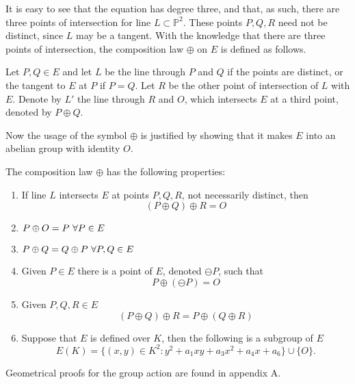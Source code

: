 It is easy to see that the equation has degree three, and that, as such, there are three points of intersection for line $L\subset\mathbb{P}^2$. These points $P,Q,R$ need not be distinct, since $L$ may be a tangent. 
With the knowledge that there are three points of intersection, the composition law $\oplus$ on $E$ is defined as follows.
\begin{defn}
	Let $P,Q\in E$ and let $L$ be the line through $P$ and $Q$ if the points are distinct, or the tangent to $E$ at $P$ if $P=Q$. Let $R$ be the other point of intersection of $L$ with $E$. Denote by $L'$ the line through $R$ and $O$, which intersects $E$ at a third point, denoted by $P\oplus Q$.
\end{defn}
Now the usage of the symbol $\oplus$ is justified by showing that it makes $E$ into an abelian group with identity $O$.
\begin{thm}
	The composition law $\oplus$ has the following properties:
	\begin{enumerate}
		\item If line $L$ intersects $E$ at points $P,Q,R$, not necessarily distinct, then
		\begin{equation*}
		(P\oplus Q)\oplus R=O
		\end{equation*}
		\item $P\oplus O=P\text{\space}\forall P\in E$
		\item $P\oplus Q=Q\oplus P\text{\space}\forall P,Q\in E$
		\item Given $P\in E$ there is a point of $E$, denoted $\ominus P$, such that
		\begin{equation*}
		P\oplus(\ominus P)=O
		\end{equation*}
		\item Given $P,Q,R\in E$
		\begin{equation*}
		(P\oplus Q)\oplus R=P\oplus(Q\oplus R)
		\end{equation*}
		\item Suppose that $E$ is defined over $K$, then the following is a subgroup of $E$
		\begin{equation*}
		E(K)=\{(x,y)\in K^2:y^2+a_1xy+a_3x^2+a_4x+a_6\}\cup\{O\}.
		\end{equation*}
	\end{enumerate}
\end{thm}
Geometrical proofs for the group action are found in appendix A.

